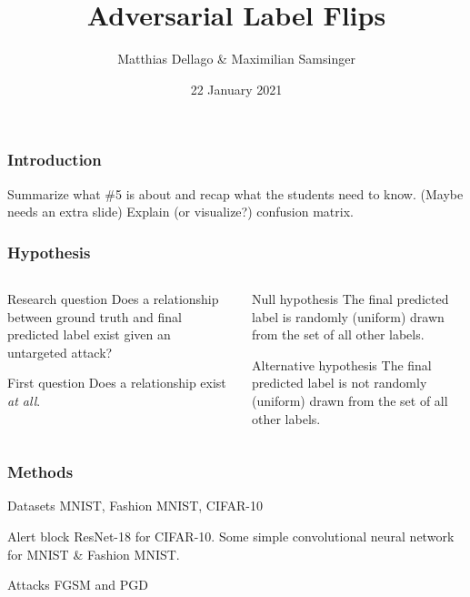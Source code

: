 \documentclass[10pt,usepdftitle=false,aspectratio=169]{beamer}
\title{Adversarial Label Flips}
\author{Matthias Dellago \& Maximilian Samsinger}
\date{22 January 2021}
\begin{document}
\DeclarePairedDelimiter\abs{\lvert}{\rvert}%
\DeclarePairedDelimiter\norm{\lVert}{\rVert}%
\DeclarePairedDelimiter\ceil{\lceil}{\rceil}
\DeclarePairedDelimiter\floor{\lfloor}{\rfloor}

\begin{frame}[plain]
	\maketitle
\end{frame}	

\begin{frame}[fragile]
	\frametitle{Introduction}
	Summarize what \#5 is about and recap what the students need to know. (Maybe needs an extra slide)
	Explain (or visualize?) confusion matrix.
\end{frame}

\begin{frame}[fragile]
	\frametitle{Hypothesis}
	\begin{columns}
		\begin{column}{.5\columnwidth}
			\begin{block}{Research question}
				Does a relationship between ground truth and final predicted label exist given an untargeted attack?
			\end{block}
			\begin{block}{First question}
				Does a relationship exist \textit{at all}.
			\end{block}
		\end{column}
		\begin{column}{.5\columnwidth}
			\begin{alertblock}{Null hypothesis}
				The final predicted label is randomly (uniform) drawn from the set of all other labels.
			\end{alertblock}
			\begin{block}{Alternative hypothesis}
				The final predicted label is not randomly (uniform) drawn from the set of all other labels.
			\end{block}
		\end{column}
	\end{columns}
\end{frame}

\begin{frame}[fragile]
	\frametitle{Methods}
		\begin{block}{Datasets}
			MNIST, Fashion MNIST, CIFAR-10
		\end{block}
		\begin{alertblock}{Alert block}
			ResNet-18 for CIFAR-10.
			Some simple convolutional neural network for MNIST \& Fashion MNIST.
		\end{alertblock}
		\begin{alertblock}{Attacks}
			FGSM and PGD
		\end{alertblock}

\end{frame}
\end{document}
